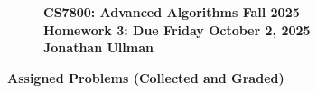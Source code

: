 \documentclass[11pt]{article}
\theoremstyle{definition}
\newcommand{\HWtitle}[2]{\begin{figure}[t!]{\bfseries \Large \color{DarkBlue}  \noindent CS7800: Advanced Algorithms \hfill Fall 2025} \\[0.2em] {\bfseries \Large \color{DarkBlue} Homework #1: Due {#2}} \\[1em] {\bfseries \large Jonathan Ullman}\\[1ex] \end{figure}}
\begin{document}

\HWtitle{3}{Friday October 2, 2025}


\renewcommand{\labelenumii}{{\bfseries \em \arabic{enumi}.\arabic{enumii}}}
\newcommand{\problemitem}{\renewcommand{\labelenumi}{{\bfseries \em Problem \arabic{enumi}}}\item}
\newcommand{\solutionitem}{\renewcommand{\labelenumi}{{\bfseries \em Solution \arabic{enumi}}}\addtocounter{enumi}{-1}\item}

\noindent\textbf{\color{blue} \Large Assigned Problems (Collected and Graded)}
\end{document}
